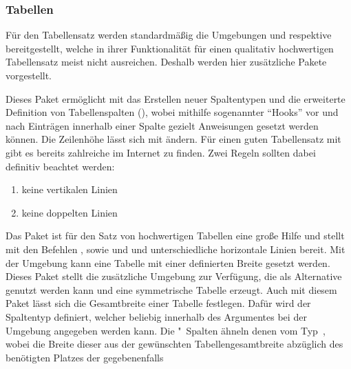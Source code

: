 \subsubsection{%
  Tabellen%
}
%
Für den Tabellensatz werden standardmäßig die Umgebungen  
und  respektive  bereitgestellt, 
welche in ihrer Funktionalität für einen qualitativ hochwertigen Tabellensatz 
meist nicht ausreichen. Deshalb werden hier zusätzliche Pakete vorgestellt. 
%
\begin{DeclarePackages}
  Dieses Paket ermöglicht mit  das Erstellen neuer 
  Spaltentypen und die erweiterte Definition von Tabellenspalten
  (\PValue{>\MPValue{\dots}}\PValue{<\MPValue{\dots}}), 
  wobei mithilfe sogenannter \enquote{Hooks} vor und nach Einträgen innerhalb 
  einer Spalte gezielt Anweisungen gesetzt werden können. Die Zeilenhöhe lässt 
  sich mit  ändern. 
  Für einen guten Tabellensatz mit  gibt es bereits zahlreiche 
   im 
  Internet zu finden. Zwei Regeln sollten dabei definitiv beachtet werden:
  \begin{enumerate}[itemindent=0pt,labelwidth=*,labelsep=1em,label=\Roman*.]
  \item keine vertikalen Linien
  \item keine doppelten Linien
  \end{enumerate}
  Das Paket  ist für den Satz von hochwertigen Tabellen eine 
  große Hilfe und stellt mit den Befehlen ,  
  sowie  und  und unterschiedliche horizontale 
  Linien bereit.
  Mit der Umgebung  kann eine Tabelle mit einer 
  definierten Breite gesetzt werden. Dieses Paket stellt die zusätzliche 
  Umgebung  zur Verfügung, die als Alternative genutzt 
  werden kann und eine symmetrische Tabelle erzeugt.
  Auch mit diesem Paket lässt sich die Gesamtbreite einer Tabelle festlegen. 
  Dafür wird der Spaltentyp  definiert, welcher beliebig innerhalb 
  des Argumentes  bei der Umgebung 
  angegeben werden kann. Die "~Spalten ähneln denen vom 
  Typ~, wobei die Breite dieser aus der gewünschten 
  Tabellengesamtbreite abzüglich des benötigten Platzes der gegebenenfalls 

\end{DeclarePackages}
